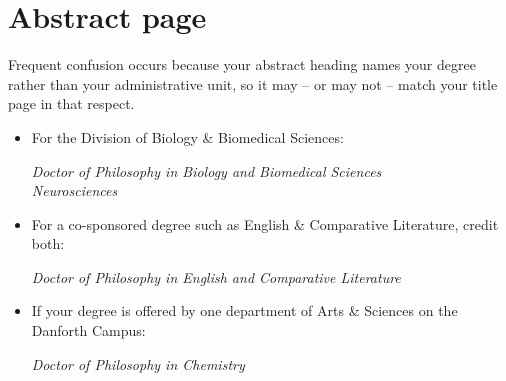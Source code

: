 \section{Abstract page}
Frequent confusion occurs because your abstract heading names your degree rather than your administrative unit, so it may – or may not – match your title page in that respect.

\begin{itemize}[$\circ$]
\zerotrivseps   %

\item For the Division of Biology \& Biomedical Sciences:
    \begin{center}
        \emph{Doctor of Philosophy in Biology and Biomedical Sciences}\\
        \emph{Neurosciences}
    \end{center}

\item For a co-sponsored degree such as English \& Comparative Literature, credit both:
    \begin{center}
        \emph{Doctor of Philosophy in English and Comparative Literature}
    \end{center}

\item If your degree is offered by one department of Arts \& Sciences on the Danforth Campus:
    \begin{center}
        \emph{Doctor of Philosophy in Chemistry}
    \end{center}

\restoretrivseps
\end{itemize}
